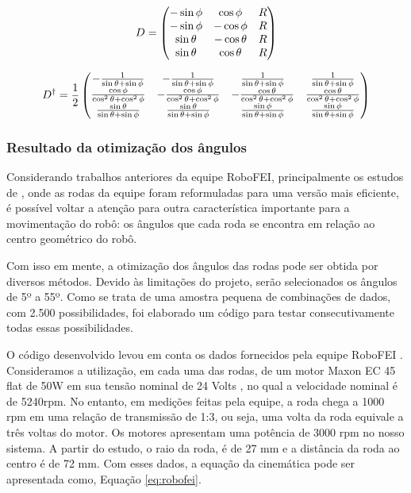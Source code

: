 \documentclass[deposito, acronym, symbols]{fei}
\begin{document}
\begin{equation} \label{eq:cindireta}
\centering  
D = 
\begin{pmatrix}
    -\sin\phi & \cos\phi & R \\ 
    -\sin\phi & -\cos\phi & R \\ 
    \sin\theta & -\cos\theta & R \\ 
    \sin\theta & \cos\theta & R
\end{pmatrix}
\end{equation}



\begin{equation} \label{eq:cininversa}
\centering  
D^\dagger = \frac{1}{2}
\begin{pmatrix}
    -\frac{1}{\sin\theta+\sin\phi} & -\frac{1}{\sin\theta+\sin\phi} & \frac{1}{\sin\theta+\sin\phi} & \frac{1}{\sin\theta+\sin\phi} \\
    \frac{\cos\phi}{\cos^2\theta+\cos^2\phi} & -\frac{\cos\phi}{\cos^2\theta+\cos^2\phi} & -\frac{\cos\theta}{\cos^2\theta+\cos^2\phi} & \frac{\cos\theta}{\cos^2\theta+\cos^2\phi} \\
    \frac{\sin\theta}{\sin\theta+\sin\phi} & \frac{\sin\theta}{\sin\theta+\sin\phi} & \frac{\sin\phi}{\sin\theta+\sin\phi} & \frac{\sin\phi}{\sin\theta+\sin\phi} 
\end{pmatrix}
\end{equation}


\subsubsection{Resultado da otimização dos ângulos} \label{resultado}

Considerando trabalhos anteriores da equipe RoboFEI, principalmente os estudos de \textcite{joaorobofei}, onde as rodas da equipe foram reformuladas para uma versão mais eficiente, é possível voltar a atenção para outra característica importante para a movimentação do robô: os ângulos que cada roda se encontra em relação ao centro geométrico do robô.

Com isso em mente, a otimização dos ângulos das rodas pode ser obtida por diversos métodos. Devido às limitações do projeto, serão selecionados os ângulos de 5º a 55º. Como se trata de uma amostra pequena de combinações de dados, com 2.500 possibilidades, foi elaborado um código para testar consecutivamente todas essas possibilidades.

O código desenvolvido levou em conta os dados fornecidos pela equipe RoboFEI \cite{robofei2023}. Consideramos a utilização, em cada uma das rodas, de um motor Maxon EC 45 flat de 50W em sua tensão nominal de 24 Volts \cite{curvacorrente},  no qual a velocidade nominal é de 5240rpm. No entanto, em medições feitas pela equipe, a roda chega a 1000 rpm em uma relação de transmissão de 1:3, ou seja, uma volta da roda equivale a três voltas do motor. Os motores apresentam uma potência de 3000 rpm no nosso sistema. A partir do estudo\textcite{joaorobofei}, o raio da roda, é de 27 mm e a distância da roda ao centro é de 72 mm. Com esses dados, a equação da cinemática pode ser apresentada como, Equação \ref{eq:robofei}.
\end{document}
